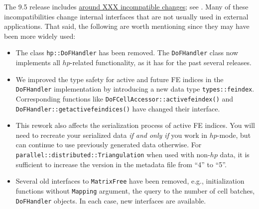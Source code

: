 \documentclass{ansarticle-preprint}
\begin{document}
The 9.5 release includes
\href{https://dealii.org/developer/doxygen/deal.II/changes_between_9_4_2_and_9_5_0.html}
     {around XXX incompatible changes};
see \cite{changes95}. Many of these
incompatibilities change internal
interfaces that are not usually used in external
applications. That said, the following are worth mentioning since they
may have been more widely used:
\begin{itemize}
  \item
  The class \texttt{hp::DoFHandler} has been removed. The
  \texttt{DoFHandler} class now implements all $hp$-related
  functionality, as it has for the past several releases.

  \item
  We improved the type safety for active and future FE indices in the \texttt{DoFHandler} implementation by introducing a new data type \texttt{types::fe\textunderscore{}index}. Corresponding functions like \texttt{DoFCellAccessor::active\textunderscore{}fe\textunderscore{}index()} and \texttt{DoFHandler::get\textunderscore{}active\textunderscore{}fe\textunderscore{}indices()} have changed their interface.

  \item
  This rework also affects the serialization process of active FE
  indices. You will need to recreate your serialized data \textit{if
    and only if} you work in $hp$-mode, but can continue to use
  previously generated data otherwise. For
  \texttt{parallel::distributed::Triangulation} when used with non-$hp$ data, it is sufficient to increase the version in the metadata file from ``4'' to ``5''.

\item Several old interfaces to \texttt{MatrixFree} have been removed, e.g.,
  initialization functions without \texttt{Mapping} argument, the query
  to the number of cell batches, \texttt{DoFHandler} objects. In
  each case, new interfaces are available.
\end{itemize}



\end{document}
